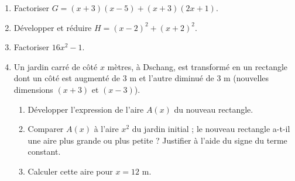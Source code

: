 \begin{enumerate}[label=\arabic*)]
\item Factoriser $G=(x+3)(x-5)+(x+3)(2x+1)$.
\item Développer et réduire $H=(x-2)^{2}+(x+2)^{2}$.
\item Factoriser $16x^{2}-1$.
\item Un jardin carré de côté $x$ mètres, à Dschang, est transformé en un rectangle dont un
côté est augmenté de $3$ m et l'autre diminué de $3$ m (nouvelles dimensions $(x+3)$ et
$(x-3)$).
\begin{enumerate}[label=\alph*)]
\item Développer l'expression de l'aire $A(x)$ du nouveau rectangle.
\item Comparer $A(x)$ à l'aire $x^{2}$ du jardin initial ; le nouveau rectangle a-t-il une
aire plus grande ou plus petite ? Justifier à l'aide du signe du terme constant.
\item Calculer cette aire pour $x=12$ m.
\end{enumerate}
\end{enumerate}

